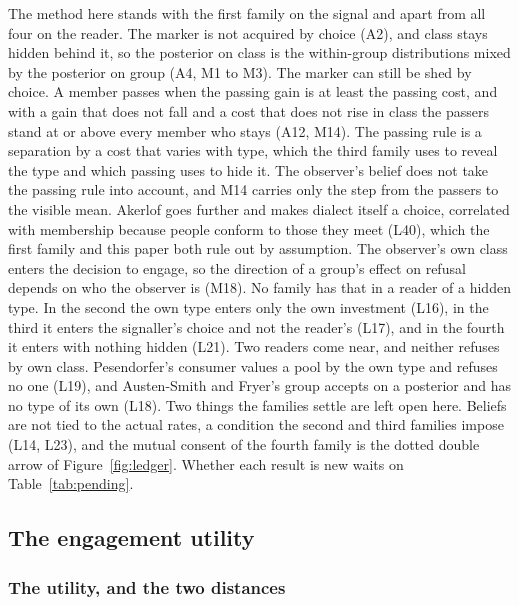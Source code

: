 The method here stands with the first family on the signal and apart from
all four on the reader. The marker is not acquired by choice (A2), and class
stays hidden behind it, so the posterior on class is the within-group
distributions mixed by the posterior on group (A4, M1 to M3). The marker can
still be shed by choice. A member passes when the passing gain is at least
the passing cost, and with a gain that does not fall and a cost that does
not rise in class the passers stand at or above every member who stays
(A12, M14). The passing rule is a separation by a cost that varies with
type, which the third family uses to reveal the type and which passing uses
to hide it. The observer's
belief does not take the passing rule into account, and M14 carries only
the step from the passers to the visible mean. Akerlof goes further and
makes dialect itself a choice, correlated with membership because people
conform to those they meet (L40), which the first family and this paper
both rule out by assumption. The observer's own class
enters the decision to engage, so the direction of a group's effect on
refusal depends on who the observer is (M18). No family has that in a
reader of a hidden type. In the second the own type enters only the own
investment (L16), in the third it enters the signaller's choice and not the
reader's (L17), and in the fourth it enters with nothing hidden (L21). Two
readers come near, and neither refuses by own class. Pesendorfer's consumer
values a pool by the own type and refuses no one (L19), and Austen-Smith
and Fryer's group accepts on a posterior and has no type of its own (L18).
Two things the families settle are left open here.
Beliefs are not tied to the actual rates, a condition the second and
third families impose (L14, L23), and the mutual consent of the fourth family is
the dotted double arrow of Figure~\ref{fig:ledger}. Whether each result is
new waits on Table~\ref{tab:pending}.

\subsection{The engagement utility}

\subsubsection{The utility, and the two distances}

